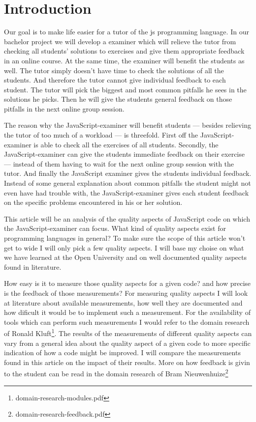 \section{Introduction} 

Our goal is to make life easier for a tutor
of the \gls{js} programming language.
In our bachelor project we will develop a \gls{examiner}
which will relieve the \gls{tutor} from checking
all \glspl{student}' \glspl{solution} to \glspl{exercise}
and give them appropriate feedback in an online course.
At the same time, the \gls{examiner} will benefit the \glspl{student} as well.
The \gls{tutor} simply doesn't have time
to check the \glspl{solution} of all the \glspl{student}.
And therefore the \gls{tutor} cannot give individual feedback
to each \gls{student}.
The \gls{tutor} will pick the biggest and most common pitfalls he sees
in the \glspl{solution} he picks.
Then he will give the \glspl{student} general feedback on those pitfalls
in the next online group session.

The reason why the JavaScript-examiner will benefit students --- besides
relieving the tutor of too much of a workload --- is threefold.  First off
the JavaScript-examiner is able to check all the exercises of all
students. Secondly, the JavaScript-examiner can give the students immediate
feedback on their exercise --- instead of them having to wait for the next
online group session with the tutor. And finally the JavaScript examiner
gives the students individual feedback. Instead of some general explanation
about common pitfalls the student might not even have had trouble with, the
JavaScript-examiner gives each student feedback on the specific problems
encountered in his or her solution.

This article will be an analysis of the quality aspects of JavaScript code on
which the JavaScript-examiner can focus.
What kind of quality aspects exist for programming languages in general?
To make sure the scope of this article won't get to wide
I will only pick a few quality aspects.
I will base my choise on what we have learned at the Open University
and on well documented quality aspects found in literature.

How easy is it to measure those quality aspects for a given code?
and how precise is the feedback of those measurements?
For measuring quality aspects
I will look at literature about available measurements,
how well they are documented
and how dificult it would be to implement such a measurement.
For the availability of tools which can perform such measurements
I would refer to the domain research of
Ronald Kluft\footnote{domain-research-modules.pdf}.
The results of the measurements of different quality aspects can vary from
a general idea about the quality aspect of a given code
to more specific indication of how a code might be improved.
I will compare the measurements found in this article
on the impact of their results.
More on how feedback is givin to the student
can be read in the domain research of
Bram Nieuwenhuize\footnote{domain-research-feedback.pdf}

